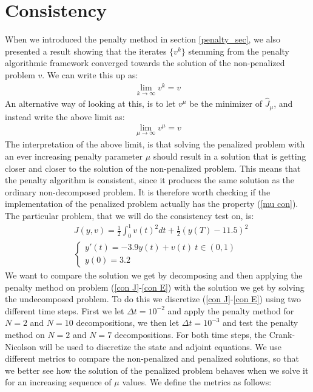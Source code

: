 \section{Consistency}
When we introduced the penalty method in section \ref{penalty_sec}, we also presented a result showing that the iterates $\{v^k\}$ stemming from the penalty algorithmic framework converged towards the solution of the non-penalized problem $v$. We can write this up as:
\begin{align*}
\lim_{k\rightarrow\infty} v^k = v 
\end{align*}  
An alternative way of looking at this, is to let $v^{\mu}$ be the minimizer of $\hat J_{\mu}$, and instead write the above limit as:
\begin{align}
\lim_{\mu\rightarrow\infty} v^{\mu} = v \label{mu con}
\end{align}
The interpretation of the above limit, is that solving the penalized problem with an ever increasing penalty parameter $\mu$ should result in a solution that is getting closer and closer to the solution of the non-penalized problem. This means that the penalty algorithm is consistent, since it produces the same solution as the ordinary non-decomposed problem. It is therefore worth checking if the implementation of the penalized problem actually has the property (\ref{mu con}). The particular problem, that we will do the consistency test on, is: 
\begin{align}
&J(y,v) = \frac{1}{2}\int_0^1v(t)^2dt + \frac{1}{2}(y(T)-11.5)^2 \label{con J} \\
&\left\{
     \begin{array}{lr}
       	y'(t)=-3.9y(t) + v(t) \ t\in(0,1)\\
       	y(0)=3.2
     \end{array}
   \right. \label{con E}
\end{align}
We want to compare the solution we get by decomposing and then applying the penalty method on problem (\ref{con J}-\ref{con E}) with the solution we get by solving the undecomposed problem. To do this we discretize (\ref{con J}-\ref{con E}) using two different time steps. First we let $\Delta t = 10^{-2}$ and apply the penalty method for $N=2$ and $N=10$ decompositions, we then let $\Delta t = 10^{-3}$ and test the penalty method on $N=2$ and $N=7$ decompositions. For both time steps, the Crank-Nicolson will be used to discretize the state and adjoint equations. We use different metrics to compare the non-penalized and penalized solutions, so that we better see how the solution of the penalized problem behaves when we solve it for an increasing sequence of $\mu$ values. We define the metrics as follows:
